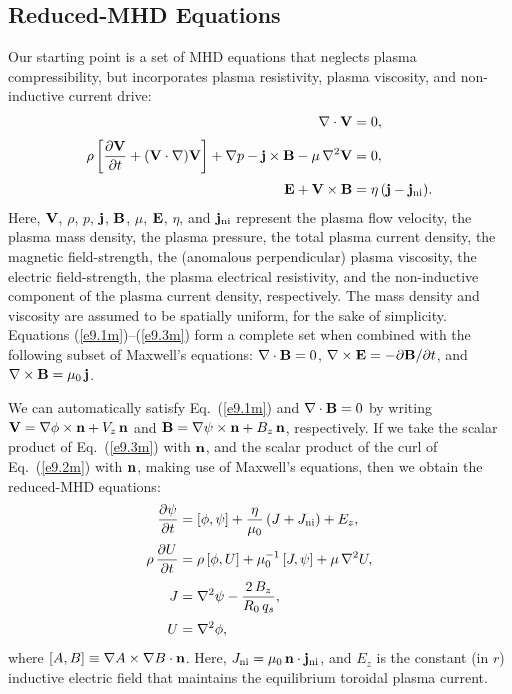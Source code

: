 \documentclass[12pt,prb,aps]{revtex4-1}
\begin{document}
\subsection{Reduced-MHD Equations}
Our starting point is a set of MHD equations that neglects plasma compressibility,
but incorporates  plasma resistivity, plasma
viscosity,  and non-inductive current drive: 
\begin{align}
\nabla\cdot{\bf V} &= 0,\label{e9.1m}\\[0.5ex]
\rho\left[\frac{\partial {\bf V}}{\partial t} + ({\bf V}\cdot\nabla) {\bf V}\right]+\nabla p -{\bf j}\times {\bf B}-\mu\,\nabla^2{\bf V} &=0,\label{e9.2m}\\[0,5ex]
{\bf E} + {\bf V} \times {\bf B} &=\eta\,({\bf j}-{\bf j}_{\rm ni}).\label{e9.3m}
\end{align}
Here, ${\bf V}$, $\rho$, $p$,   ${\bf j}$, ${\bf B}$,  $\mu$, ${\bf E}$, $\eta$, and ${\bf j}_{\rm ni}$  represent the plasma flow velocity, the plasma mass density, the plasma
pressure, the total plasma current density, 
 the magnetic field-strength,  the (anomalous perpendicular) plasma viscosity, the electric field-strength,  the plasma electrical resistivity, and the non-inductive component of the plasma current density, respectively.  The  mass density  and viscosity are  assumed to be spatially uniform, for the sake of simplicity.  
Equations (\ref{e9.1m})--(\ref{e9.3m})  form a complete set when combined with the following subset of 
Maxwell's equations:
$\nabla\cdot{\bf B} =0$,
$ \nabla\times {\bf E}=-\partial{\bf B}/\partial t$, and $\nabla\times {\bf B} = \mu_0\,{\bf j}$.
 
We can automatically satisfy Eq.~(\ref{e9.1m}) and
$\nabla\cdot{\bf B}=0$ by writing
${\bf V} = \nabla\phi\times {\bf n} + V_z\,{\bf n}$ and ${\bf B} = \nabla\psi\times {\bf n} + B_z\,{\bf n}$, respectively. 
If we take the scalar product of Eq.~(\ref{e9.3m}) with ${\bf n}$, and the scalar product of the curl of Eq.~(\ref{e9.2m}) with ${\bf n}$, making use of
Maxwell's equations, then we obtain the reduced-MHD equations:\cite{strauss}
\begin{align}\label{e4}
\frac{\partial\psi}{\partial t} &= [\phi,\psi] +\frac{\eta}{\mu_0}\,(J + J_{\rm ni}) + E_z,\\[0.5ex]
\rho\,\frac{\partial U}{\partial t}&=\rho\,[\phi,U] + \mu_0^{-1}\,[J,\psi]+\mu\,\nabla^2 U,\\[0.5ex]
J & = \nabla^2\psi - \frac{2\,B_z}{R_0\,q_s},\\[0.5ex]
U &=\nabla^2 \phi,\label{e7}
\end{align}
where $[A,B]\equiv \nabla A\times \nabla B\cdot{\bf n}$.
Here, $J_{\rm ni} = \mu_0\,{\bf n}\cdot{\bf j}_{\rm ni}$, 
and $E_z$ is the constant (in $r$) inductive electric
field that maintains the equilibrium toroidal plasma current. 
\end{document}
